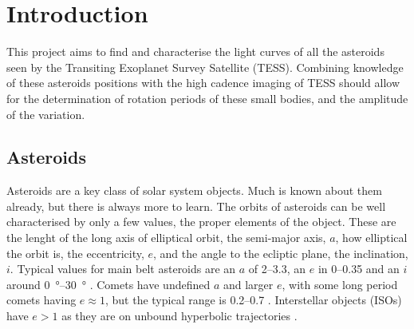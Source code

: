 \documentclass{UCreport}
\begin{document}
\toc %

\listoffigures
\newpage
{}
\listoftables
\newpage


\section{Introduction}\label{Sec:Intro}

This project aims to find and characterise the light curves of all the asteroids seen by the Transiting Exoplanet Survey Satellite (TESS).
Combining knowledge of these asteroids positions with the high cadence imaging of TESS should allow for the determination of rotation periods of these small bodies, and the amplitude of the variation.


\subsection{Asteroids}\label{SubSec:Asteroid}

Asteroids are a key class of solar system objects. Much is known about them already, but there is always more to learn.
The orbits of asteroids can be well characterised by only a few values, the proper elements of the object.
These are the lenght of the long axis of elliptical orbit, the semi-major axis, $a$, how elliptical the orbit is, the eccentricity, $e$, and the angle to the ecliptic plane, the inclination,$i$.
Typical values for main belt asteroids are an $a$ of \qtyrange{2}{3.3}{\au}, an $e$ in \qtyrange{0}{0.35}{} and an $i$ around \qtyrange{0}{30}{\degree} \citep{DeMeo2015}.
Comets have undefined $a$ and larger $e$, with some long period comets having $e\approx 1$, but the typical range is \qtyrange{0.2}{0.7}{} \citep{Lewis2012}.
Interstellar objects (ISOs) have $e>1$ as they are on unbound hyperbolic trajectories \citep{McGlynn1989}.


\end{document}
